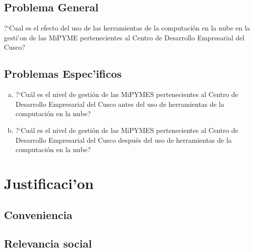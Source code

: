 \subsection{Problema General}
?`Cual es el efecto del uso de las herramientas de la computaci\'on en la nube
en la gesti'on de las MiPYME pertenecientes al Centro de Desarrollo Empresarial
del Cusco?
\subsection{Problemas Espec'ificos}
\begin{enumerate}[a.]
\item ?`Cu\'al es el nivel de gesti\'on de las MiPYMES pertenecientes al Centro
de Desarrollo Empresarial del Cusco antes del uso de herramientas de la computaci\'on
en la nube?
\item ?`Cu\'al es el nivel de gesti\'on de las MiPYMES pertenecientes al Centro
de Desarrollo Empresarial del Cusco despu\'es del uso de herramientas de la computaci\'on
en la nube?
\end{enumerate}
%
%
\section{Justificaci'on}
\subsection{Conveniencia}

\subsection{Relevancia social}


